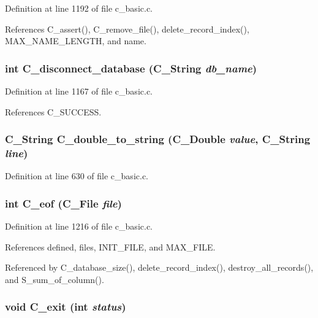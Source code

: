 Definition at line 1192 of file c\_\-basic.c.

References C\_\-assert(), C\_\-remove\_\-file(), delete\_\-record\_\-index(), MAX\_\-NAME\_\-LENGTH, and name.
\subsubsection{\setlength{\rightskip}{0pt plus 5cm}int C\_\-disconnect\_\-database (\bf{C\_\-String} {\em db\_\-name})}\label{c__basic_8c_b5abdfe6c742ec90cb21001990e9a359}




Definition at line 1167 of file c\_\-basic.c.

References C\_\-SUCCESS.
\subsubsection{\setlength{\rightskip}{0pt plus 5cm}\bf{C\_\-String} C\_\-double\_\-to\_\-string (\bf{C\_\-Double} {\em value}, \bf{C\_\-String} {\em line})}\label{c__basic_8c_daabdc56919dd3dbe9df0c68df6ca0dd}




Definition at line 630 of file c\_\-basic.c.
\subsubsection{\setlength{\rightskip}{0pt plus 5cm}int C\_\-eof (\bf{C\_\-File} {\em file})}\label{c__basic_8c_fd5d61c706051dedc63ed2bf210c4370}




Definition at line 1216 of file c\_\-basic.c.

References defined, files, INIT\_\-FILE, and MAX\_\-FILE.

Referenced by C\_\-database\_\-size(), delete\_\-record\_\-index(), destroy\_\-all\_\-records(), and S\_\-sum\_\-of\_\-column().
\subsubsection{\setlength{\rightskip}{0pt plus 5cm}void C\_\-exit (int {\em status})}\label{c__basic_8c_32cdf224b079aa8b1797810edbec450f}




